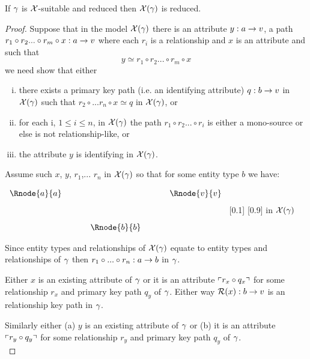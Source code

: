 \begin{lemma}
If $\gamma$ is $\mathcal{X}$-suitable and reduced then $\mathcal{X}(\gamma)$ is reduced.
\end{lemma}
\begin{proof}
Suppose that in the model $\mathcal{X}(\gamma)$ there is an attribute $y:a \rightarrow v$, a  path $r_1 \circ r_2 ...\circ r_m \circ x :a \rightarrow v$ where each $r_i$ is a relationship
and $x$ is an attribute and
 such that 
\begin{equation}
\label {reductionequation}
y \simeq r_1 \circ r_2 ...\circ r_m \circ x
\end{equation} 
we need show that either 
\begin{enumerate} [(i)]
\item there exists a primary key path (i.e. an identifying attribute) $q:b \rightarrow v$ in $\mathcal{X}(\gamma)$ such that $r_2 \circ ... r_n \circ x \simeq q$ in $\mathcal{X}(\gamma)$, or
\item for each i, $1 \leq i \leq n$, in $\mathcal{X}(\gamma)$ the path $r_1 \circ r_2 ... \circ r_i$ is either a mono-source or else is not relationship-like, or
\item the attribute $y$ is identifying in $\mathcal{X}(\gamma)$.
\end{enumerate}
Assume such $x$, $y$, $r_1$,... $r_n$ in $\mathcal{X}(\gamma)$ so that for some entity type $b$ we have:

\begin{center}
$
\begin{array}{cp{0.5cm}c p{0.5cm} c}
\Rnode{a}{a} &  &              & & \Rnode{v}{\veee}  \\ [1cm]
             &  & \Rnode{b}{b} & &               
\end{array}
$
[0.1]
[0.9]
 in $\mathcal{X}(\gamma)$
\end{center}

Since entity types and relationships of $\mathcal{X}(\gamma)$ equate to entity types and relationships of $\gamma$ then $r_1 \circ ... \circ r_n : a \rightarrow b$ in $\gamma$.

Either $x$ is an existing attribute of $\gamma$ or it is an attribute $\left\ulcorner r_x \circ q_x\right\urcorner$ for some relationship $r_x$ and primary key path $q_y$ of $\gamma$.
Either way  $\mathcal{R}(x):b \rightarrow v$ is an relationship key path in $\gamma$. 

Similarly either (a) $y$ is an existing attribute of $\gamma$ or (b) it is an attribute $\left\ulcorner r_y \circ q_y\right\urcorner$ for some relationship $r_y$ and primary key path $q_y$ of $\gamma$. \\


\end{proof}
